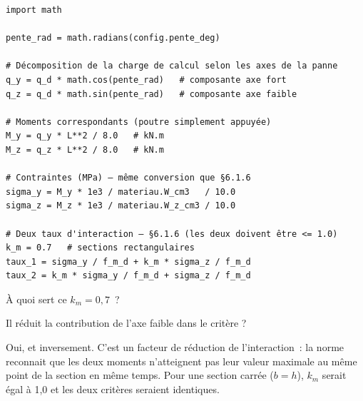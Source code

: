 \begin{lstlisting}[style=python, caption={Décomposition de charge et interaction biaxiale}]
import math

pente_rad = math.radians(config.pente_deg)

# Décomposition de la charge de calcul selon les axes de la panne
q_y = q_d * math.cos(pente_rad)   # composante axe fort
q_z = q_d * math.sin(pente_rad)   # composante axe faible

# Moments correspondants (poutre simplement appuyée)
M_y = q_y * L**2 / 8.0   # kN.m
M_z = q_z * L**2 / 8.0   # kN.m

# Contraintes (MPa) — même conversion que §6.1.6
sigma_y = M_y * 1e3 / materiau.W_cm3   / 10.0
sigma_z = M_z * 1e3 / materiau.W_z_cm3 / 10.0

# Deux taux d'interaction — §6.1.6 (les deux doivent être <= 1.0)
k_m = 0.7   # sections rectangulaires
taux_1 = sigma_y / f_m_d + k_m * sigma_z / f_m_d
taux_2 = k_m * sigma_y / f_m_d + sigma_z / f_m_d
\end{lstlisting}

\begin{maitre}
\`A quoi sert ce $k_m = 0{,}7$~?
\end{maitre}

\begin{apprenti}
Il r\'eduit la contribution de l'axe faible dans le crit\`ere ?
\end{apprenti}

\begin{maitre}
Oui, et inversement. C'est un facteur de r\'eduction de l'interaction~:
la norme reconnait que les deux moments n'atteignent pas leur valeur maximale
au m\^eme point de la section en m\^eme temps.
Pour une section carr\'ee ($b = h$), $k_m$ serait \'egal \`a 1{,}0
et les deux crit\`eres seraient identiques.
\end{maitre}